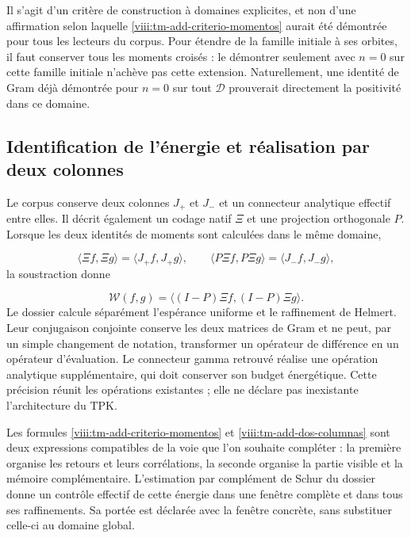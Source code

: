 Il s'agit d'un critère de construction à domaines explicites, et non d'une affirmation selon laquelle \eqref{viii:tm-add-criterio-momentos} aurait été démontrée pour tous les lecteurs du corpus. Pour étendre de la famille initiale à ses orbites, il faut conserver tous les moments croisés : le démontrer seulement avec \(n=0\) sur cette famille initiale n'achève pas cette extension. Naturellement, une identité de Gram déjà démontrée pour \(n=0\) sur tout \(\mathcal D\) prouverait directement la positivité dans ce domaine.


\subsection{Identification de l'énergie et réalisation par deux colonnes}
\label{viii:tm-add-c6}
Le corpus conserve deux colonnes \(J_+\) et \(J_-\) et un connecteur analytique effectif entre elles. Il décrit également un codage natif \(\Xi\) et une projection orthogonale \(P\). Lorsque les deux identités de moments sont calculées dans le même domaine,

\[
\langle\Xi f,\Xi g\rangle=\langle J_+f,J_+g\rangle,
\qquad
\langle P\Xi f,P\Xi g\rangle=\langle J_-f,J_-g\rangle,
\]
la soustraction donne

\begin{equation}
\mathscr W(f,g)=\langle(I-P)\Xi f,(I-P)\Xi g\rangle.
\label{viii:tm-add-dos-columnas}
\end{equation}
Le dossier calcule séparément l'espérance uniforme et le raffinement de Helmert. Leur conjugaison conjointe conserve les deux matrices de Gram et ne peut, par un simple changement de notation, transformer un opérateur de différence en un opérateur d'évaluation. Le connecteur gamma retrouvé réalise une opération analytique supplémentaire, qui doit conserver son budget énergétique. Cette précision réunit les opérations existantes ; elle ne déclare pas inexistante l'architecture du TPK.

Les formules \eqref{viii:tm-add-criterio-momentos} et \eqref{viii:tm-add-dos-columnas} sont deux expressions compatibles de la voie que l'on souhaite compléter : la première organise les retours et leurs corrélations, la seconde organise la partie visible et la mémoire complémentaire. L'estimation par complément de Schur du dossier donne un contrôle effectif de cette énergie dans une fenêtre complète et dans tous ses raffinements. Sa portée est déclarée avec la fenêtre concrète, sans substituer celle-ci au domaine global.


